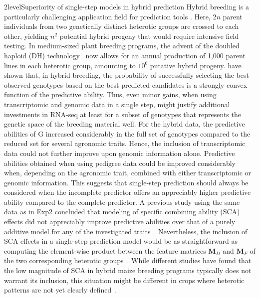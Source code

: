 \documentclass[12pt,titlepage]{article}
\begin{document}
\Genetics2level{Superiority of single-step models in hybrid prediction}
Hybrid breeding is a particularly challenging application field for prediction
tools \cite{Kadam2016}.
Here, $2n$ parent individuals from two genetically distinct heterotic groups are
crossed to each other, yielding $n^{2}$ potential hybrid progeny that would
require intensive field testing.
In medium-sized plant breeding programs, the advent of the doubled haploid (DH) 
technology~\cite{Wedzony2009} now allows for an annual production of 1,000 
parent lines in each heterotic group, amounting to $10^{6}$ putative hybrid
progeny.
 have shown that, in hybrid breeding, the probability 
of successfully selecting the best observed genotypes based on the best 
predicted candidates is a strongly convex function of the predictive ability.
Thus, even minor gains, when using transcriptomic and genomic data in a
single step, might justify additional investments in RNA-seq at least for a
subset of genotypes that represents the genetic space of the breeding 
material well.
For the hybrid data, the predictive abilities of G increased considerably in the
full set of genotypes compared to the reduced set for several agronomic traits.
Hence, the inclusion of transcriptomic data could not further improve upon
genomic information alone.
Predictive abilities obtained when using pedigree data could be 
improved considerably when, depending on the agronomic trait, combined with 
either transcriptomic or genomic information.
This suggests that single-step prediction should always be considered when the
incomplete predictor offers an appreciably higher predictive ability compared
to the complete predictor.
A previous study using the same data as in Exp2 concluded that modeling of
specific combining ability (SCA) effects did not appreciably improve predictive
abilities over that of a purely additive model for any of the investigated
traits~\cite{Westhues2017}.
Nevertheless, the inclusion of SCA effects in a single-step prediction model
would be as straightforward as computing the element-wise product between the
feature matrices $\mathbf{M}_{D}$ and $\mathbf{M}_{F}$ of the two corresponding
heterotic groups~\cite{Martini2016}.
While different studies have found that the low magnitude of SCA in hybrid maize
breeding programs typically does not warrant its inclusion, this situation
might be different in crops where heterotic patterns are not yet clearly
defined~\cite{Zhao2015}.
\end{document}
